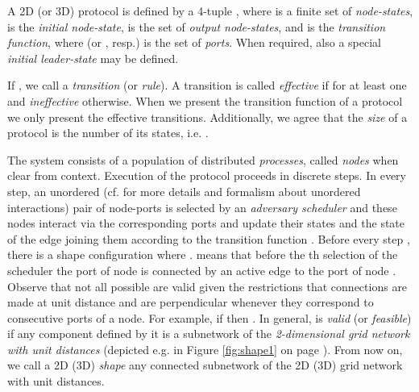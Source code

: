 \documentclass[oribibl, 11pt]{llncs}
\begin{document}
\begin{definition}
A 2D (or 3D) protocol is defined by a 4-tuple , where  is a finite set of \emph{node-states},  is the \emph{initial node-state},  is the set of \emph{output node-states}, and  is the \emph{transition function}, where  (or , resp.) is the set of \emph{ports}. When required, also a special \emph{initial leader-state}  may be defined.
\end{definition}

If , we call  a \emph{transition} (or \emph{rule}). A transition  is called \emph{effective} if  for at least one  and \emph{ineffective} otherwise. When we present the transition function of a protocol we only present the effective transitions. Additionally, we agree that the \emph{size} of a protocol is the number of its states, i.e. .

The system consists of a population  of  distributed \emph{processes}, called \emph{nodes} when clear from context. Execution of the protocol proceeds in discrete steps. In every step, an unordered (cf. \cite{MS14} for more details and formalism about unordered interactions) pair of node-ports  is selected by an \emph{adversary scheduler} and these nodes interact via the corresponding ports and update their states and the state of the edge joining them according to the transition function . Before every step , there is a shape configuration  where .  means that before the th selection of the scheduler the  port of node  is connected by an active edge to the  port of node . Observe that not all possible  are valid given the restrictions that connections are made at unit distance and are perpendicular whenever they correspond to consecutive ports of a node. For example, if  then . In general,  is \emph{valid} (or \emph{feasible}) if any component defined by it is a subnetwork of the \emph{2-dimensional grid network with unit distances} (depicted e.g. in Figure \ref{fig:shape1} on page \pageref{fig:shape1}). From now on, we call a 2D (3D) \emph{shape} any connected subnetwork of the 2D (3D) grid network with unit distances. 
\end{document}
